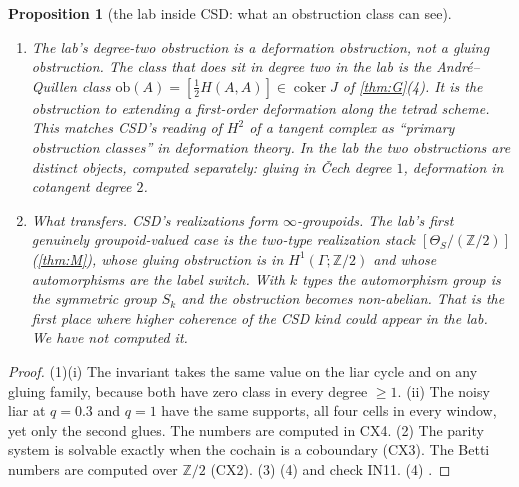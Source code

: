 \documentclass[11pt]{article}
\newtheorem{proposition}{Proposition}\newtheorem{corollary}{Corollary}\newtheorem{lemma}{Lemma}
\theoremstyle{definition}\newtheorem{definition}{Definition}\newtheorem{remark}{Remark}
\begin{document}
\begin{proposition}[the lab inside CSD: what an obstruction class can see]
\begin{enumerate}
\item[(3)] \emph{The lab's degree-two obstruction is a deformation obstruction, not a gluing obstruction.} The class that \emph{does}
  sit in degree two in the lab is the André--Quillen class $\mathrm{ob}(A)=[\tfrac12H(A,A)]\in\operatorname{coker}J$ of \cref{thm:G}(4).
  It is the obstruction to extending a first-order deformation along the tetrad scheme. This matches CSD's reading of $H^2$ of a tangent
  complex as ``primary obstruction classes'' in deformation theory. In the lab the two obstructions are distinct objects, computed
  separately: gluing in Čech degree $1$, deformation in cotangent degree $2$.
\item[(4)] \emph{What transfers.} CSD's realizations form $\infty$-groupoids. The lab's first genuinely groupoid-valued case is the
  two-type realization stack $[\Theta_S/(\mathbb Z/2)]$ (\cref{thm:M}), whose gluing obstruction is in $H^1(\Gamma;\mathbb Z/2)$ and whose
  automorphisms are the label switch. With $k$ types the automorphism group is the symmetric group $S_k$ and the obstruction becomes
  non-abelian. That is the first place where higher coherence of the CSD kind could appear in the lab. We have not computed it.
\end{enumerate}
\end{proposition}

\begin{proof}
(1)(i) The invariant takes the same value on the liar cycle and on any gluing family, because both have zero class in every degree
$\ge1$. (ii) The noisy liar at $q=0.3$ and $q=1$ have the same supports, all four cells in every window, yet only the second glues. The
numbers are computed in CX4. (2) The parity system is solvable exactly when the cochain is a coboundary (CX3). The Betti numbers are
computed over $\mathbb Z/2$ (CX2). (3) (4) and check IN11. (4) .
\end{proof}
\end{document}
